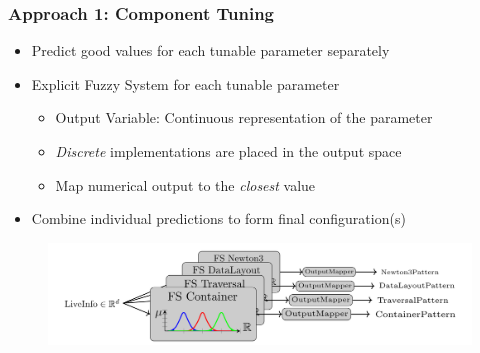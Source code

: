 \documentclass[
	10pt,
	t		%
]{beamer}
\begin{document}
\begin{frame}
	\frametitle{Approach 1: Component Tuning}
	\begin{itemize}
		\item Predict good values for each tunable parameter separately
		\item Explicit Fuzzy System for each tunable parameter
		      \begin{itemize}
			      \item Output Variable: Continuous representation of the parameter
			      \item \textit{Discrete} implementations are placed in the output space
			      \item Map numerical output to the \textit{closest} value\\
		      \end{itemize}
		\item Combine individual predictions to form final configuration(s)
	\end{itemize}

	\begin{figure}
		\centering
		\includegraphics[width=1\textwidth]{figures/component-approach.png}
	\end{figure}

\end{frame}
\end{document}
